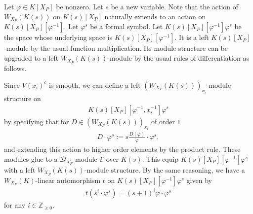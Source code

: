 \documentclass[11pt,a4paper,usenames,dvipsnames,reqno]{amsart}
\numberwithin{equation}{section}
\newcommand{\zz}{\mathbb Z}
\theoremstyle{definition}
\theoremstyle{remark}
\begin{document}



Let $\varphi\in K[X_P]$ be nonzero. Let $s$ be a new variable. Note that the action of $W_{X_P}(K(s))$ on $K(s)[X_P]$ naturally extends to an action on $K(s)[X_P][\varphi^{-1}]$.  Let $\varphi^s$ be a formal symbol. Let $K(s)[X_P][\varphi^{-1}]\varphi^s$ be the space whose underlying space is $K(s)[X_P][\varphi^{-1}]$. It is a left $K(s)[X_P]$-module by the usual function multiplication. Its module structure can be upgraded to a left $W_{X_P}(K(s))$-module by the usual rules of differentiation as follows.

 Since $V(x_i)^c$ is smooth, we can define a left $(W_{X_P}(K(s)))_{x_i}$-module structure on
\begin{align*}
    K(s)[X_P][\varphi^{-1},x_i^{-1}]\varphi^s
\end{align*}
by specifying that for $D\in (W_{X_P}(K(s)))_{x_i}$ of order $1$
\begin{align*}
      D\cdot \varphi^s:=s\frac{D(\varphi)}{\varphi} \cdot \varphi^s,
\end{align*}
and extending this action to higher order elements by the product rule. These modules glue to a $\mathcal{D}_{X_P^\circ}$-module $\mathcal{E}$ over $K(s)$. This equip $K(s)[X_P][\varphi^{-1}] \varphi^s$ with a left $W_{X_P}(K(s))$-module structure. By the same reasoning, we have a $W_{X_P}(K)$-linear automorphism $t$ on $K(s)[X_P][\varphi^{-1}]\varphi^s$ given by
\begin{align}\label{eq:t}
    t(s^i\cdot \varphi^s)=(s+1)^i\varphi\cdot \varphi^s
\end{align}
for any $i\in\zz_{\ge 0}.$ 
\end{document}
